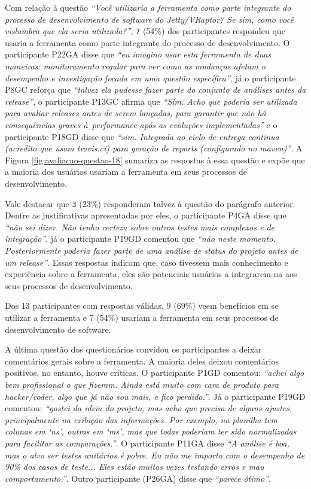 Com relação à questão \textit{``Você utilizaria a ferramenta como parte integrante do processo de desenvolvimento de software do Jetty/VRaptor? Se sim, como você vislumbra que ela seria utilizada?''}, \texttt{7} (54\%) dos participantes respondeu que usaria a ferramenta como parte integrante do processo de desenvolvimento. O participante P22GA disse que \textit{``eu imagino usar esta ferramenta de duas maneiras: monitoramento regular para ver como as mudanças afetam o desempenho e investigação focada em uma questão específica''}, já o participante P8GC reforça que \textit{``talvez ela pudesse fazer parte do conjunto de análises antes da release''}, o participante P13GC afirma que \textit{``Sim. Acho que poderia ser utilizada para avaliar releases antes de serem lançadas, para garantir que não há consequências graves à performance após as evoluções implementadas''} e o participante P18GD disse que \textit{``sim. Integrada ao ciclo de entrega continua (acredito que usam travis.ci) para geração de reports (configurado no maven)''}. A Figura \ref{fig:avaliacao-questao-18} sumariza as respostas à essa questão e expõe que a maioria dos usuários usariam a ferramenta em seus processos de desenvolvimento.

Vale destacar que \texttt{3} (23\%) responderam talvez à questão do parágrafo anterior. Dentre as justificativas apresentadas por eles, o participante P4GA disse que \textit{``não sei dizer. Não tenho certeza sobre outros testes mais complexos e de integração''}, já o participante P19GD comentou que \textit{``não neste momento. Posteriormente poderia fazer parte de uma análise de status do projeto antes de um release''}. Essas respostas indicam que, caso tivessem mais conhecimento e experiência sobre a ferramenta, eles são potenciais usuários a integrarem-na aos seus processos de desenvolvimento.

\begin{framed}
  \noindent Dos 13 participantes com respostas válidas, 9 (69\%) veem benefícios em se utilizar a ferramenta e 7 (54\%) usariam a ferramenta em seus processos de desenvolvimento de software.
\end{framed}

A última questão dos questionários convidou os participantes a deixar comentários gerais sobre a ferramenta. A maioria deles deixou comentários positivos, no entanto, houve críticas. O participante P1GD comentou: \textit{``achei algo bem profissional o que fizeram. Ainda está muito com cara de produto para hacker/coder, algo que já não sou mais, e fico perdido.''}. Já o participante P19GD comentou: \textit{``gostei da ideia do projeto, mas acho que precisa de alguns ajustes, principalmente na exibição das informações. Por exemplo, na planilha tem colunas em `ns', outras em `ms', mas que todas poderiam ter sido normalizadas para facilitar as comparações.''}. O participante P11GA disse \textit{``A análise é boa, mas o alvo ser testes unitários é pobre. Eu não me importo com o desempenho de 90\% dos casos de teste... Eles estão muitas vezes testando erros e mau comportamento.''}. Outro participante (P26GA) disse que \textit{``parece ótimo''}.

